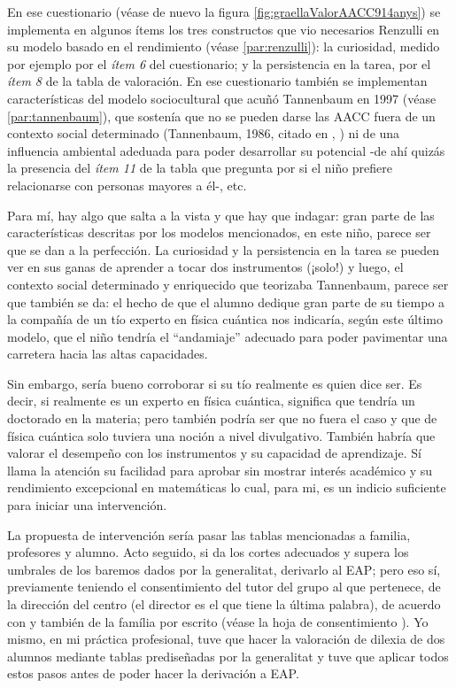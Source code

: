 \documentclass[12pt, a4paper]{article}
\begin{document}
	En ese cuestionario (véase de nuevo la figura \ref{fig:graellaValorAACC914anys}) se implementa en algunos ítems los tres constructos que vio necesarios Renzulli en su modelo basado en el rendimiento (véase \ref{par:renzulli}): la curiosidad, medido por ejemplo por el \textit{ítem 6} del cuestionario; y la persistencia en la tarea, por el \textit{ítem 8} de la tabla de valoración. En ese cuestionario también se implementan características del modelo sociocultural que acuñó Tannenbaum en 1997 (véase \ref{par:tannenbaum}), que sostenía que no se pueden darse las AACC fuera de un contexto social determinado  (Tannenbaum, 1986, citado en \citeauthor{Arocas2002OrientPsicopedGVA}, \citeyear{Arocas2002OrientPsicopedGVA}) ni de una influencia ambiental adeduada para poder desarrollar su potencial \parencite{reche2019models} -de ahí quizás la presencia del \textit{ítem 11} de la tabla que pregunta por si el niño prefiere relacionarse con personas mayores a él-, etc.
	
	Para mí, hay algo que salta a la vista y que hay que indagar: gran parte de las características descritas por los modelos mencionados, en este niño, parece ser que se dan a la perfección. La curiosidad y la persistencia en la tarea se pueden ver en sus ganas de aprender a tocar dos instrumentos (¡solo!) y luego, el contexto social determinado y enriquecido que teorizaba Tannenbaum, parece ser que también se da: el hecho de que el alumno dedique gran parte de su tiempo a la compañía de un tío experto en física cuántica nos indicaría, según este último modelo, que el niño tendría el ``andamiaje'' adecuado para poder pavimentar una carretera hacia las altas capacidades. 
	
	Sin embargo, sería bueno corroborar si su tío realmente es quien dice ser. Es decir, si realmente es un experto en física cuántica, significa que tendría un doctorado en la materia; pero también podría ser que no fuera el caso y que de física cuántica solo tuviera una noción a nivel divulgativo. También habría que valorar el desempeño con los instrumentos y su capacidad de aprendizaje. Sí llama la atención su facilidad para aprobar sin mostrar interés académico y su rendimiento excepcional en matemáticas lo cual, para mi, es un indicio suficiente para iniciar una intervención.
	
	La propuesta de intervención sería pasar las tablas mencionadas a familia, profesores y alumno. Acto seguido, si da los cortes adecuados y supera los umbrales de los baremos dados por la generalitat, derivarlo al EAP; pero eso sí, previamente teniendo el consentimiento del tutor del grupo al que pertenece, de la dirección del centro (el director es el que tiene la última palabra), de acuerdo con \textcite[19]{gencatAltesCapacitats2013} y también de la família por escrito (véase la hoja de consentimiento \textcite[38]{gencatAltesCapacitats2013}). Yo mismo, en mi práctica profesional, tuve que hacer la valoración de dilexia de dos alumnos mediante tablas prediseñadas por la generalitat y tuve que aplicar todos estos pasos antes de poder hacer la derivación a EAP.
	
\end{document}
